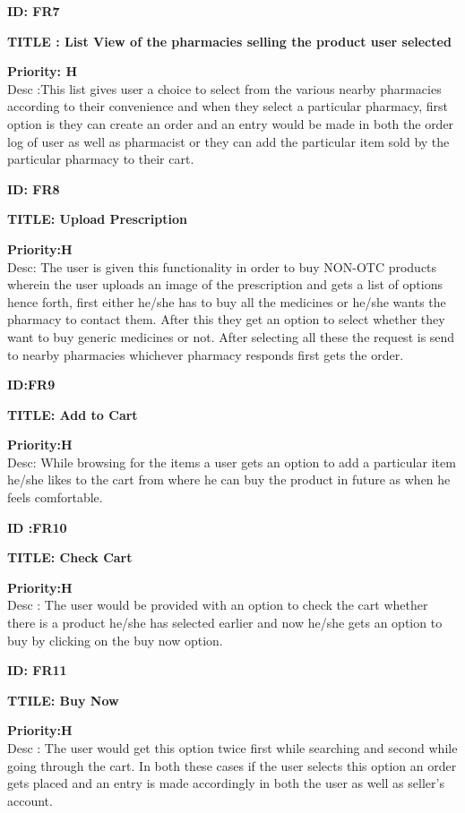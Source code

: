 \documentclass{scrreprt}
\begin{document}
\item \textbf{ID: FR7}
\item \textbf{TITLE : List View of the pharmacies selling the product user selected}
\item \textbf{Priority: H}\\
Desc :This list gives user a choice to select from the various nearby pharmacies according to their convenience and when they select a particular pharmacy, first option is they can create an order and an entry would be made in both the order log of user as well as pharmacist or they can add the particular item sold by the particular pharmacy to their cart.\\

\item \textbf{ID: FR8}
\item \textbf{TITLE: Upload Prescription}
\item \textbf{Priority:H}\\
Desc: The user is given this functionality in order to buy NON-OTC products wherein the user uploads an image of the prescription and gets a list of options hence forth, first either he/she has to buy all the medicines or he/she wants the pharmacy to contact them. After this they get an option to select whether they want to buy generic medicines or not. After selecting all these the request is send to nearby pharmacies whichever pharmacy responds first gets the order.\\

\item \textbf{ID:FR9}
\item \textbf{TITLE: Add to Cart}
\item \textbf{Priority:H}\\
Desc: While browsing for the items a user gets an option to add a particular item he/she likes to the cart from where he can buy the product in future as when he feels comfortable.\\

\item \textbf{ID :FR10}
\item \textbf{TITLE: Check Cart}
\item \textbf{Priority:H}\\
Desc : The user would be provided with an option to check the cart whether there is a product he/she has selected earlier and now he/she gets an option to buy by clicking on the buy now option.\\

\item \textbf{ID: FR11}
\item \textbf{TTILE: Buy Now}
\item \textbf{Priority:H}\\
Desc : The user would get this option twice first while searching and second while going through the cart. In both these cases if the user selects this option an order gets placed and an entry is made accordingly in both the user as well as seller’s account.\\
\end{document}
